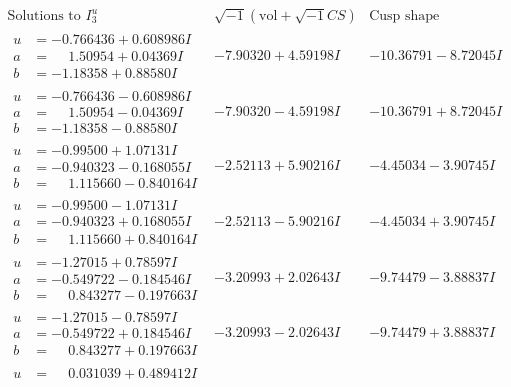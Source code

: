 \documentclass[1p]{elsarticle_modified}
\theoremstyle{definition}
\newcommand{\I}{\sqrt{-1}}
\begin{document}
$$\begin{array}{c|c|c}  
\text{Solutions to }I^u_{3}& \I (\text{vol} + \sqrt{-1}CS) & \text{Cusp shape}\\
 \hline 
\begin{aligned}
u &= -0.766436 + 0.608986 I \\
a &= \phantom{-}1.50954 + 0.04369 I \\
b &= -1.18358 + 0.88580 I\end{aligned}
 & -7.90320 + 4.59198 I & -10.36791 - 8.72045 I \\ \hline\begin{aligned}
u &= -0.766436 - 0.608986 I \\
a &= \phantom{-}1.50954 - 0.04369 I \\
b &= -1.18358 - 0.88580 I\end{aligned}
 & -7.90320 - 4.59198 I & -10.36791 + 8.72045 I \\ \hline\begin{aligned}
u &= -0.99500 + 1.07131 I \\
a &= -0.940323 - 0.168055 I \\
b &= \phantom{-}1.115660 - 0.840164 I\end{aligned}
 & -2.52113 + 5.90216 I & -4.45034 - 3.90745 I \\ \hline\begin{aligned}
u &= -0.99500 - 1.07131 I \\
a &= -0.940323 + 0.168055 I \\
b &= \phantom{-}1.115660 + 0.840164 I\end{aligned}
 & -2.52113 - 5.90216 I & -4.45034 + 3.90745 I \\ \hline\begin{aligned}
u &= -1.27015 + 0.78597 I \\
a &= -0.549722 - 0.184546 I \\
b &= \phantom{-}0.843277 - 0.197663 I\end{aligned}
 & -3.20993 + 2.02643 I & -9.74479 - 3.88837 I \\ \hline\begin{aligned}
u &= -1.27015 - 0.78597 I \\
a &= -0.549722 + 0.184546 I \\
b &= \phantom{-}0.843277 + 0.197663 I\end{aligned}
 & -3.20993 - 2.02643 I & -9.74479 + 3.88837 I \\ \hline\begin{aligned}
u &= \phantom{-}0.031039 + 0.489412 I \\

\end{aligned}
\end{array}$$
\end{document}
